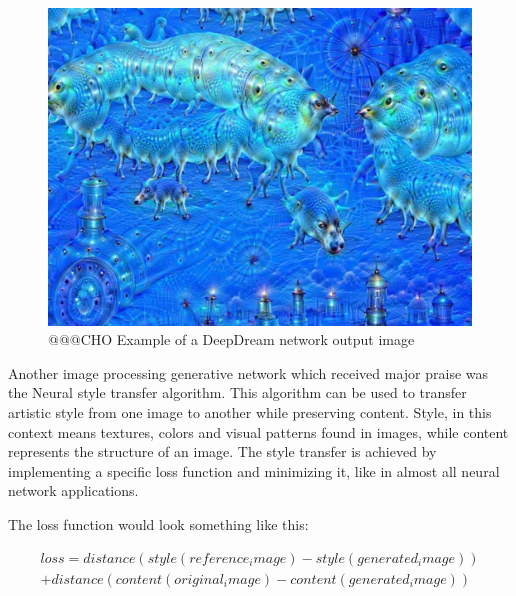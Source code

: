 \documentclass[b5paper]{book}
\begin{document}
\begin{figure}
    \centering
    \includegraphics[scale=0.2]{figures/deepdream.png}
    \caption{@@@CHO Example of a DeepDream network output image}
    \label{fig:deepdream}
\end{figure}

Another image processing generative network which received major praise was the Neural style transfer algorithm. This algorithm can be used to transfer artistic style from one image to another while preserving content. Style, in this context means textures, colors and visual patterns found in images, while content represents the structure of an image. The style transfer is achieved by implementing a specific loss function and minimizing it, like in almost all neural network applications.

The loss function would look something like this:

\begin{multline*}
loss = distance(style(reference_image) - style(generated_image))\\
+ distance(content(original_image) - content(generated_image))
\end{multline*}
\end{document}
